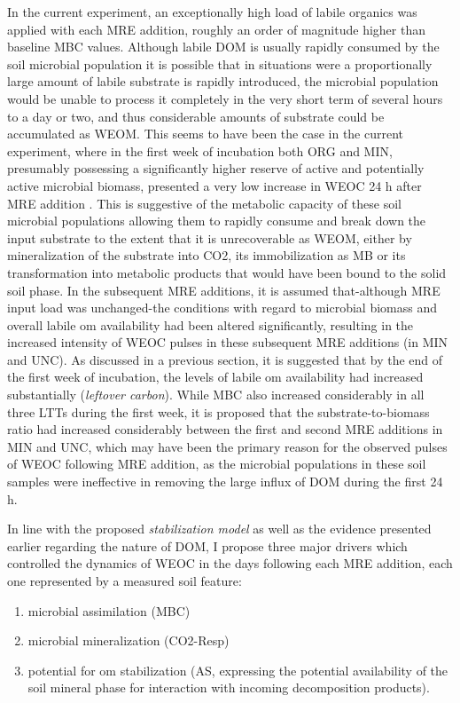 \documentclass[12pt]{report}
\begin{document}
		In the current experiment, an exceptionally high load of labile organics was applied with each MRE addition, roughly an order of magnitude higher than baseline MBC values.  Although labile DOM is usually rapidly consumed by the soil microbial population\myRed{*} it is possible that in situations were a proportionally large amount of labile substrate is rapidly introduced, the microbial population would be unable to process it completely\myRed{*} in the very short term of several hours to a day or two, and thus considerable amounts of substrate could be accumulated as WEOM. This seems to have been the case in the current experiment, where in the first week of incubation both ORG and MIN, presumably possessing a significantly higher reserve of active and potentially active microbial biomass, presented a very low increase in WEOC 24 h after MRE addition . This is suggestive of the metabolic capacity of these soil microbial populations allowing them to rapidly consume and break down the input substrate to the extent that it is unrecoverable as WEOM, either by mineralization of the substrate into CO2, its immobilization as MB or its transformation into metabolic products that would have been bound to the solid soil phase.
		In the subsequent MRE additions, it is assumed that-although MRE input load was unchanged-the conditions with regard to microbial biomass and overall labile \gls{om} availability had been altered significantly, resulting in the increased intensity of WEOC pulses in these subsequent MRE additions (in MIN and UNC). As discussed in a previous section, it is suggested that by the end of the first week of incubation, the levels of labile \gls{om} availability had increased substantially (\textit{leftover carbon}). While MBC also increased  considerably in all three LTTs during the first week, it is proposed that the substrate-to-biomass  ratio had increased considerably between the first and second MRE additions in MIN and UNC, which may have been the primary reason for the observed pulses of WEOC following MRE addition, as the microbial populations in these soil samples were ineffective in removing the large influx of DOM during the first 24 h.
		
		In line with the proposed \textit{stabilization model} as well as the evidence presented earlier regarding the nature of DOM, I propose three  major drivers which controlled the dynamics of WEOC in the days following each MRE addition, each one represented by a measured soil feature:
		\begin{enumerate}
			\item microbial assimilation (MBC)
			\item microbial mineralization (CO2-Resp)
			\item potential for \gls{om} stabilization (AS, expressing the potential availability of the soil mineral phase for interaction with incoming decomposition products).
		\end{enumerate}
		
\end{document}
